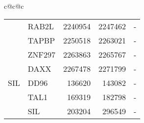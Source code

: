 \begin{tabular}{c@{\quad}c@{\quad}c}
\begin{tabular}[t]{|r|lrrc|}
         & RAB2L      &  2240954 &  2247462 & - \\
         & TAPBP      &  2250518 &  2263021 & - \\
         & ZNF297     &  2263863 &  2265767 & - \\
         & DAXX       &  2267478 &  2271799 & - \\
\hline
     SIL & DD96       &   136620 &   143082 & - \\
         & TAL1       &   169319 &   182798 & - \\
         & SIL        &   203204 &   296549 & - \\
\hline
\end{tabular}
\\
\end{tabular}
